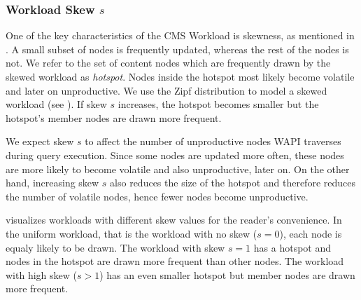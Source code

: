 \documentclass[abstracton,12pt]{scrartcl}
\theoremstyle{definition}
\begin{document}
\subsubsection{Workload Skew $s$}

\label{sec:skew}

One of the key characteristics of the CMS Workload is skewness, as mentioned in 
. A small subset of nodes is frequently updated,
whereas the rest of the nodes is not. We refer to the set of content nodes
which are frequently drawn by the skewed workload as \textit{hotspot}.
Nodes inside the hotspot most likely become volatile and later on unproductive.
We use the Zipf distribution to model a skewed workload (see ).
If skew $s$ increases, the hotspot becomes smaller 
but the hotspot's member nodes are drawn more frequent.


We expect skew $s$ to affect the number of unproductive nodes WAPI traverses during
query execution. Since some nodes are updated more often, these nodes are more likely
to become volatile
and also unproductive, later on. On the other hand, increasing skew $s$ also reduces
the size of the hotspot and therefore reduces
the number of volatile nodes, hence fewer nodes become unproductive.

 visualizes workloads with different skew values for the
reader's convenience. In the uniform workload, that is the workload with no skew ($s=0$),
each node is equaly likely to be drawn. The workload with skew $s=1$ has a hotspot
and nodes in the hotspot are drawn more frequent than other nodes. The workload
with high skew ($s>1$) has an even smaller hotspot but member nodes are drawn more frequent.

\end{document}
